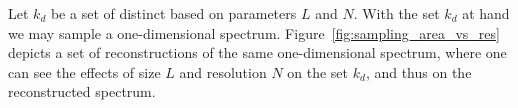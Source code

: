 Let $k_d$ be a set of distinct \wavenumbers based on parameters $L$ and $N$.
With the \wavenumber set $k_d$ at hand we may sample a one-dimensional
\wavenumber spectrum. Figure~\ref{fig:sampling_area_vs_res} depicts a set of
reconstructions of the same one-dimensional \wavenumber spectrum, where one
can see the effects of size $L$ and resolution $N$ on the \wavenumber set $k_d$,
and thus on the reconstructed spectrum.


